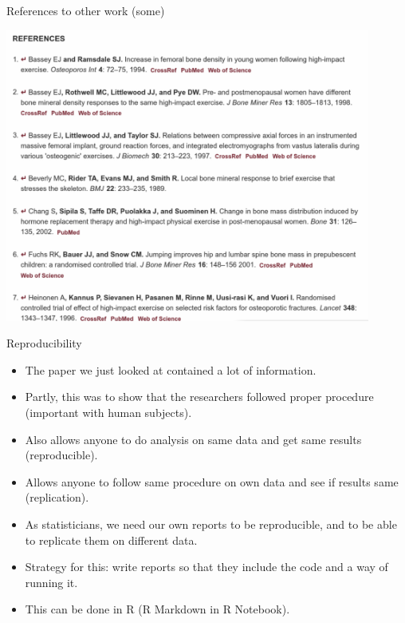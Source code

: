 \documentclass[
  ignorenonframetext,
]{beamer}
\providecommand{\tightlist}{%
  \setlength{\itemsep}{0pt}\setlength{\parskip}{0pt}}
\begin{document}
\begin{frame}{References to other work (some)}
\protect\hypertarget{references-to-other-work-some}{}

\includegraphics[width=0.9\textwidth]{refs}

\end{frame}

\begin{frame}{Reproducibility}
\protect\hypertarget{reproducibility}{}

\begin{itemize}
\tightlist
\item
  The paper we just looked at contained a lot of information.
\item
  Partly, this was to show that the researchers followed proper
  procedure (important with human subjects).
\item
  Also allows anyone to do analysis on same data and get same results
  (reproducible).
\item
  Allows anyone to follow same procedure on own data and see if results
  same (replication).
\item
  As statisticians, we need our own reports to be reproducible, and to
  be able to replicate them on different data.
\item
  Strategy for this: write reports so that they include the code and a
  way of running it.
\item
  This can be done in R (R Markdown in R Notebook).
\end{itemize}

\end{frame}
\end{document}
